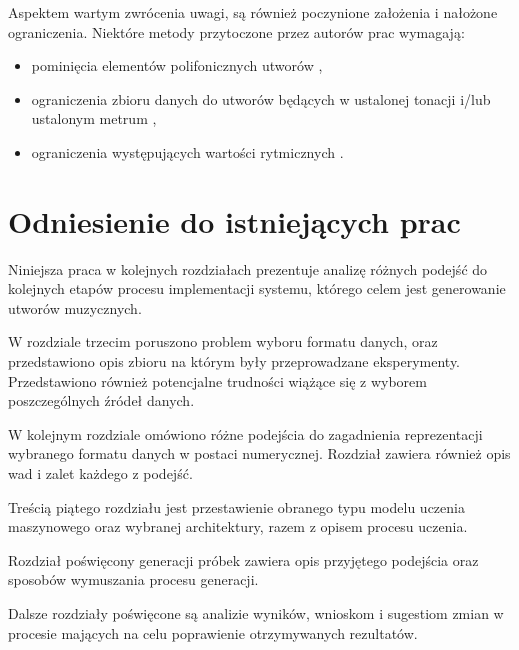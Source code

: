 {{    Aspektem wartym zwrócenia uwagi, są również poczynione założenia i nałożone
    ograniczenia. Niektóre metody przytoczone przez autorów prac wymagają:
    \begin{itemize}
      \item pominięcia elementów polifonicznych utworów \cite{Sturm2015FolkMS, Hadjeres2016DeepBachAS},
      \item ograniczenia zbioru danych do utworów będących w 
      ustalonej tonacji i/lub ustalonym metrum \cite{Sturm2015FolkMS, Wu2017AHR},
      \item ograniczenia występujących wartości rytmicznych \cite{Hadjeres2016DeepBachAS}.
    \end{itemize}
  }

  \section{Odniesienie do istniejących prac}
  {
    Niniejsza praca w kolejnych rozdziałach prezentuje analizę różnych podejść do kolejnych etapów
    procesu implementacji systemu, którego celem jest generowanie utworów muzycznych. 

    W rozdziale trzecim poruszono problem wyboru formatu danych, oraz przedstawiono opis zbioru na którym
    były przeprowadzane eksperymenty. Przedstawiono również potencjalne trudności wiążące się z wyborem
    poszczególnych źródeł danych.

    W kolejnym rozdziale omówiono różne podejścia do zagadnienia reprezentacji wybranego formatu 
    danych w postaci numerycznej. Rozdział zawiera również opis wad i zalet każdego z podejść.

    Treścią piątego rozdziału jest przestawienie obranego typu modelu uczenia maszynowego oraz 
    wybranej architektury, razem z opisem procesu uczenia.

    Rozdział poświęcony generacji próbek zawiera opis przyjętego podejścia oraz sposobów 
    wymuszania procesu generacji.

    Dalsze rozdziały poświęcone są analizie wyników, wnioskom i sugestiom zmian w procesie mających na celu 
    poprawienie otrzymywanych rezultatów.
  }

}
